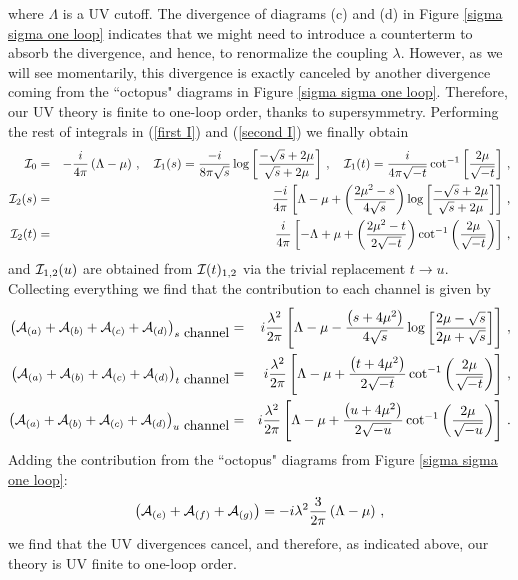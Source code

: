 \documentclass[11pt]{article}
\begin{document}
%
where $\Lambda$ is a UV cutoff. The divergence of diagrams (c) and (d) in Figure  \ref{sigma sigma one loop}  indicates that we might need to introduce a counterterm  to absorb the divergence, and hence, to renormalize the coupling $\lambda$. However, as we will see momentarily, this divergence is exactly canceled by another divergence coming from the ``octopus" diagrams in Figure  \ref{sigma sigma one loop}. Therefore, our UV theory is finite to one-loop order, thanks to supersymmetry.  Performing the rest of integrals in (\ref{first I}) and (\ref{second I}) we finally obtain
%
\begin{eqnarray}
\nonumber
{\cal I}_0&=&-\frac{i}{4\pi}\left(\Lambda-\mu\right)\,,\quad {\cal I}_1(s)=\frac{-i}{8\pi\sqrt{s}}\log\left[\frac{-\sqrt s+2\mu}{\sqrt s+2\mu}\right]\,,\quad
{\cal I}_1(t)=\frac{i}{4\pi\sqrt{-t}}\cot^{-1}\left[\frac{2\mu}{\sqrt{-t}}\right]\,,\\
\nonumber
{\cal I}_2(s)&=&\frac{-i}{4\pi}\left[\Lambda-\mu+\left(\frac{2\mu^2-s}{4\sqrt{s}}\right)\log\left[\frac{-\sqrt s+2\mu}{\sqrt s+2\mu}\right]\right]\,,\\
{\cal I}_2(t)&=&\frac{i}{4\pi}\left[-\Lambda+\mu+\left(\frac{2\mu^2-t}{2\sqrt{-t}}\right)\cot^{-1}\left(\frac{2\mu}{\sqrt {-t}} \right) \right]\,,
\end{eqnarray}
%
and ${\cal I}_{1,2}(u)$ are obtained from ${\cal I}(t)_{1,2}$ via the trivial replacement $t\rightarrow u$. Collecting everything we find that the  contribution to each channel is given by
%
\begin{eqnarray}
\nonumber
\left({\cal A}_{(a)}+{\cal A}_{(b)}+{\cal A}_{(c)}+{\cal A}_{(d)}\right)_{s~\mbox{channel}}&=&i\frac{\lambda^2}{2 \pi }\left[\Lambda -\mu -\frac{\left(s+4\mu^2\right)}{4\sqrt s}\log \left[\frac{2\mu-\sqrt s}{2\mu+\sqrt s}\right]\right]\,,\\
\nonumber
\left({\cal A}_{(a)}+{\cal A}_{(b)}+{\cal A}_{(c)}+{\cal A}_{(d)}\right)_{t~\mbox{channel}}&=&i\frac{\lambda^2}{2 \pi }\left[\Lambda-\mu +\frac{\left(t+4\mu^2\right)}{2\sqrt{-t}}\cot^{-1}\left(\frac{2\mu}{\sqrt{-t}}\right) \right]\,,\\
\nonumber
\left({\cal A}_{(a)}+{\cal A}_{(b)}+{\cal A}_{(c)}+{\cal A}_{(d)}\right)_{u~\mbox{channel}}&=&i\frac{\lambda^2}{2 \pi }\left[\Lambda-\mu+\frac{\left(u+4\mu^2\right)}{2\sqrt{-u}}\cot^{-1}\left(\frac{2\mu}{\sqrt{-u}}\right) \right]\,.\\
\end{eqnarray}
%
Adding the contribution from the ``octopus" diagrams from Figure \ref{sigma sigma one loop}:
%
\begin{eqnarray}
\left({\cal A}_{(e)}+{\cal A}_{(f)}+{\cal A}_{(g)}\right)=-i\lambda^2\frac{3}{2\pi}\left(\Lambda -\mu\right)\,,
\end{eqnarray}
%
we find that the UV divergences cancel, and therefore, as indicated above, our theory is UV finite to one-loop order.
\end{document}
